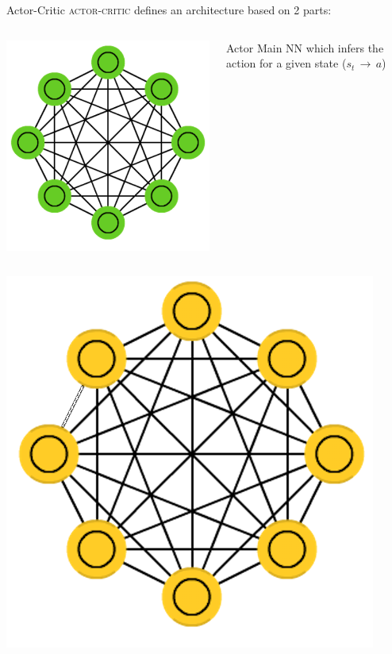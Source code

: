 \documentclass[aspectratio=169]{beamer}
\begin{document}
\begin{frame}{Actor-Critic}
	\textsc{actor-critic} defines an architecture based on 2 parts:
	\begin{columns}[T]
		\begin{column}{0.1\textwidth}
		\includegraphics[scale=0.2]{img/agreen.png}
		\end{column}
		\begin{column}{0.7\textwidth}
			\begin{alertblock}{Actor}
			Main \textsc{NN} which infers the action for a given state ($s_t\,\rightarrow\, a$)
			\end{alertblock}
		\end{column}
	\end{columns}
	\vfill
	\begin{columns}[T]
		\begin{column}{0.1\textwidth}
		\includegraphics[scale=0.2]{img/ayellow.png}

\end{column}
\end{columns}
\end{frame}
\end{document}
